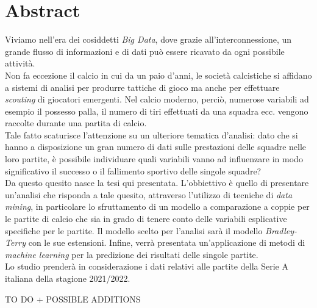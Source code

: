 
\cleardoublepage
{}
{}
\begingroup
\let\clearpage\relax
\let\cleardoublepage\relax
\let\cleardoublepage\relax

\chapter*{Abstract}

Viviamo nell'era dei cosiddetti \emph{Big Data}, dove grazie all'interconnessione, un grande flusso di informazioni e di dati può essere ricavato da ogni possibile attività. \\
Non fa eccezione il calcio in cui da un paio d'anni, le società calcistiche si affidano a sistemi di analisi per produrre tattiche di gioco ma anche per effettuare \textit{scouting} di giocatori emergenti. Nel calcio moderno, perciò, numerose variabili ad esempio il possesso palla, il numero di tiri effettuati da una squadra ecc. vengono raccolte durante una partita di calcio.\\
Tale fatto scaturisce l'attenzione su un ulteriore tematica d'analisi: dato che si hanno a disposizione un gran numero di dati sulle prestazioni delle squadre nelle loro partite, è possibile individuare quali variabili vanno ad influenzare in modo significativo il successo o il fallimento sportivo delle singole squadre? \\
Da questo quesito nasce la tesi qui presentata. L’obbiettivo è quello di presentare un'analisi che risponda a tale quesito, attraverso l'utilizzo di tecniche di \textit{data mining}, in particolare lo sfruttamento di un modello a comparazione a coppie per le partite di calcio che sia in grado di tenere conto delle variabili esplicative specifiche per le partite. Il modello scelto per l’analisi sarà il modello \emph{Bradley-Terry} con le sue estensioni. Infine, verrà presentata un’applicazione di metodi di \textit{machine learning} per la predizione dei risultati delle singole partite. \\
Lo studio prenderà in considerazione i dati relativi alle partite della Serie A italiana della stagione 2021/2022.

TO DO + POSSIBLE ADDITIONS






%
%

\endgroup			

\vfill

